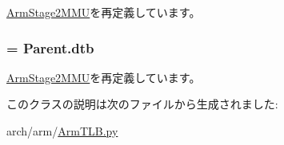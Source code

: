 \hyperlink{classArmTLB_1_1ArmStage2MMU_a9909fd406bc2a10a29e8593c7fccf8b4}{ArmStage2MMU}を再定義しています。\hypertarget{classArmTLB_1_1ArmStage2DMMU_aca6615da7b6b14e4b80293f21e77790c}{
\subsubsection[{tlb}]{ = Parent.dtb}}
\label{classArmTLB_1_1ArmStage2DMMU_aca6615da7b6b14e4b80293f21e77790c}


\hyperlink{classArmTLB_1_1ArmStage2MMU_abccbff0f41ec90da875f4c4782845f8c}{ArmStage2MMU}を再定義しています。

このクラスの説明は次のファイルから生成されました:\begin{DoxyCompactItemize}
\item 
arch/arm/\hyperlink{ArmTLB_8py}{ArmTLB.py}\end{DoxyCompactItemize}
